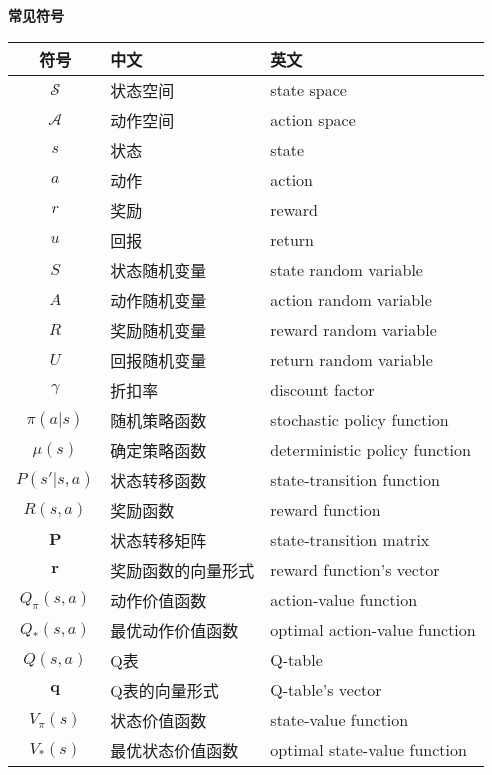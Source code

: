 \begin{center}
    \bfseries {} 常见符号
\end{center}

\begin{table}[h]
    \centering
    \begin{tabular}{cll}
        \hline
        \textbf{符号} & \textbf{中文} & \textbf{英文} \\ 
        \hline
        $\mathcal{S}$ & 状态空间 & state space \\
        $\mathcal{A}$ & 动作空间 & action space \\
        $s$ & 状态 & state \\
        $a$ & 动作 & action \\
        $r$ & 奖励 & reward \\
        $u$ & 回报 & return \\
        $S$ & 状态随机变量 & state random variable \\
        $A$ & 动作随机变量 & action random variable \\
        $R$ & 奖励随机变量 & reward random variable \\
        $U$ & 回报随机变量 & return random variable \\
        $\gamma$ & 折扣率 & discount factor \\
        $\pi(a|s)$ & 随机策略函数 & stochastic policy function \\
        $\mu(s)$ & 确定策略函数 & deterministic policy function \\
        $P(s'|s,a)$ & 状态转移函数 & state-transition function \\
        $R(s,a)$ & 奖励函数 & reward function \\
        $\bm{P}$ & 状态转移矩阵 & state-transition matrix \\
        $\bm{r}$ & 奖励函数的向量形式 & reward function's vector \\
        $Q_\pi(s,a)$ & 动作价值函数 & action-value function \\
        $Q_*(s,a)$ & 最优动作价值函数 & optimal action-value function \\
        $Q(s,a)$ & Q表 & Q-table \\
        $\bm{q}$ & Q表的向量形式 & Q-table's vector \\
        $V_\pi(s)$ & 状态价值函数 & state-value function \\
        $V_*(s)$ & 最优状态价值函数 & optimal state-value function \\
        \hline
    \end{tabular}
\end{table}